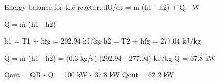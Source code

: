 Energy balance for the reactor:  
dU/dt = m (h1 - h2) + Q̇ - Ẇ  

Q̇ = ṁ (h1 - h2)  

h1 = T1 + hfg = 292.94 kJ/kg  
h2 = T2 + hfg = 277.04 kJ/kg  

Q̇ = ṁ (h1 - h2) = (0.3 kg/s) (292.94 - 277.04) kJ/kg  
Q̇ = 37.8 kW  

Q̇out = Q̇R - Q̇ = 100 kW - 37.8 kW  
Q̇out = 62.2 kW